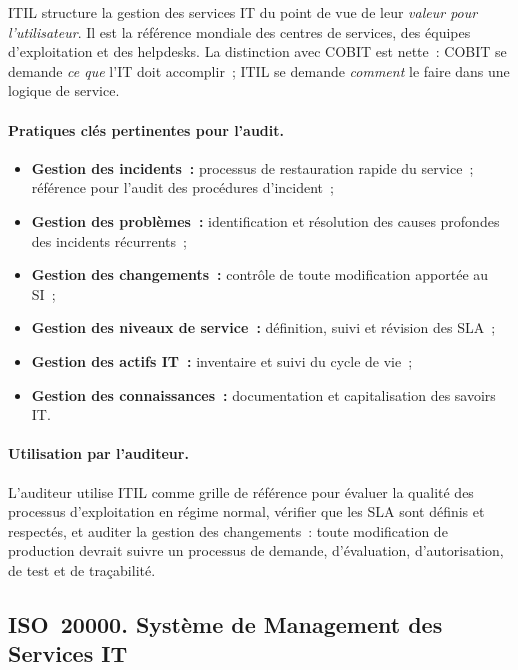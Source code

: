 ITIL structure la gestion des services IT du point de vue de leur \emph{valeur pour
l'utilisateur}. Il est la référence mondiale des centres de services, des équipes d'exploitation
et des helpdesks. La distinction avec COBIT est nette~: COBIT se demande \emph{ce que} l'IT
doit accomplir~; ITIL se demande \emph{comment} le faire dans une logique de service.

\paragraph{Pratiques clés pertinentes pour l'audit.}
\begin{itemize}
    \item \textbf{Gestion des incidents~:} processus de restauration rapide du service~; référence
        pour l'audit des procédures d'incident~;
    \item \textbf{Gestion des problèmes~:} identification et résolution des causes profondes des
        incidents récurrents~;
    \item \textbf{Gestion des changements~:} contrôle de toute modification apportée au SI~;
    \item \textbf{Gestion des niveaux de service~:} définition, suivi et révision des SLA~;
    \item \textbf{Gestion des actifs IT~:} inventaire et suivi du cycle de vie~;
    \item \textbf{Gestion des connaissances~:} documentation et capitalisation des savoirs IT.
\end{itemize}

\paragraph{Utilisation par l'auditeur.} L'auditeur utilise ITIL comme grille de référence pour
évaluer la qualité des processus d'exploitation en régime normal, vérifier que les SLA sont
définis et respectés, et auditer la gestion des changements~: toute modification de production
devrait suivre un processus de demande, d'évaluation, d'autorisation, de test et de traçabilité.

\subsection{ISO~20000. Système de Management des Services IT}
\label{subsec:iso20000}

